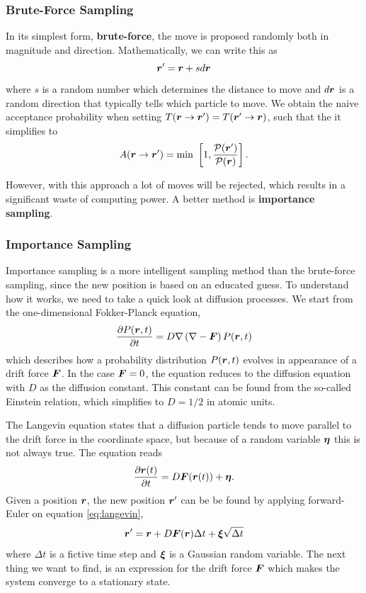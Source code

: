 \subsubsection{Brute-Force Sampling}
In its simplest form, \textbf{brute-force}, the move is proposed randomly both in magnitude and direction. Mathematically, we can write this as
\begin{equation}
\boldsymbol{{r}}'=\boldsymbol{{r}}+sd\boldsymbol{{r}}
\end{equation}
where $s$ is a random number which determines the distance to move and $d\boldsymbol{{r}}$ is a random direction that typically tells which particle to move. We obtain the naive acceptance probability when setting $T(\boldsymbol{{r}}\rightarrow\boldsymbol{{r}}')=T(\boldsymbol{{r}}'\rightarrow\boldsymbol{{r}})$, such that the it simplifies to
\begin{equation}
A(\boldsymbol{{r}}\rightarrow\boldsymbol{{r}}')=\text{min }\left[1,\frac{\mathcal{P}(\boldsymbol{{r}}')}{\mathcal{P}(\boldsymbol{{r}})}\right].
\end{equation}

However, with this approach a lot of moves will be rejected, which results in a significant waste of computing power. A better method is \textbf{importance sampling}.

\subsubsection{Importance Sampling}
Importance sampling is a more intelligent sampling method than the brute-force sampling, since the new position is based on an educated guess. To understand how it works, we need to take a quick look at diffusion processes. We start from the one-dimensional Fokker-Planck equation,
\begin{equation}
\frac{\partial P(\boldsymbol{{r}},t)}{\partial t}=D\nabla\left(\nabla-\boldsymbol{{F}}\right)P(\boldsymbol{{r}},t)
\end{equation}
which describes how a probability distribution $P(\boldsymbol{{r}},t)$ evolves in appearance of a drift force $\boldsymbol{{F}}$. In the case $\boldsymbol{{F}}=0$, the equation reduces to the diffusion equation with $D$ as the diffusion constant. This constant can be found from the so-called Einstein relation, which simplifies to $D=1/2$ in atomic units. 

The Langevin equation states that a diffusion particle tends to move parallel to the drift force in the coordinate space, but because of a random variable $\boldsymbol{{\eta}}$ this is not always true. The equation reads
\begin{equation}
\frac{\partial \boldsymbol{{r}}(t)}{\partial t}=D\boldsymbol{{F}}(\boldsymbol{{r}}(t))+\boldsymbol{{\eta}}.
\label{eq:langevin}
\end{equation}
Given a position $\boldsymbol{{r}}$, the new position $\boldsymbol{{r}}'$ can be be found by applying forward-Euler on equation \eqref{eq:langevin},
\begin{equation}
\boldsymbol{{r}}'=\boldsymbol{{r}}+D\boldsymbol{{F}}(\boldsymbol{{r}})\Delta t + \boldsymbol{{\xi}}\sqrt{\Delta t}
\end{equation}
where $\Delta t$ is a fictive time step and $\boldsymbol{{\xi}}$ is a Gaussian random variable. The next thing we want to find, is an expression for the drift force $\boldsymbol{{F}}$ which makes the system converge to a stationary state. 

